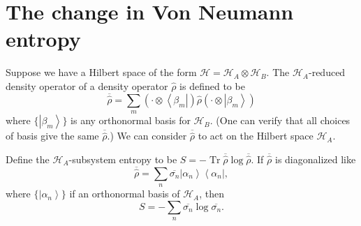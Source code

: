 \documentclass[11pt]{article}
\newcommand{\bra}[1]{\left\langle#1\right|}
\newcommand{\ket}[1]{\left|#1\right\rangle}
\newcommand{\hilb}{\mathcal{H}}
\newcommand{\op}[1]{\hat{#1}}
\theoremstyle{theorem}
\theoremstyle{remark}
\theoremstyle{step}
\theoremstyle{gap}
\begin{document}
\section{The change in Von Neumann entropy}

Suppose we have a Hilbert space of the form \(\hilb = \hilb_A \otimes \hilb_B\). The \(\hilb_A\)-reduced density operator of a density operator \(\op{\rho}\) is defined to be
\[\overline{\op{\rho}} = \sum_m \left(\cdot\otimes\bra{\beta_m}\right) \op{\rho} \left(\cdot\otimes\ket{\beta_m}\right)\]
where \(\{\ket{\beta_m}\}\) is any orthonormal basis for \(\hilb_B\). (One can verify that all choices of basis give the same \(\overline{\op{\rho}}\).)
We can consider \(\overline{\op{\rho}}\) to act on the Hilbert space \(\hilb_A\).

Define the \(\hilb_A\)-subsystem entropy to be \(S = -\operatorname{Tr} \overline{\op{\rho}} \log \overline{\op{\rho}}\). If \(\overline{\op{\rho}}\) is diagonalized like
\begin{equation}\label{eq.redrhodef}
\overline{\op{\rho}} = \sum_n \overline{\sigma_n} \ket{\alpha_n}\bra{\alpha_n},
\end{equation}
where \(\{\ket{\alpha_n}\}\) if an orthonormal basis of \(\hilb_A\), then
\[S = -\sum_n \overline{\sigma_n} \log \overline{\sigma_n}.\]
\end{document}
